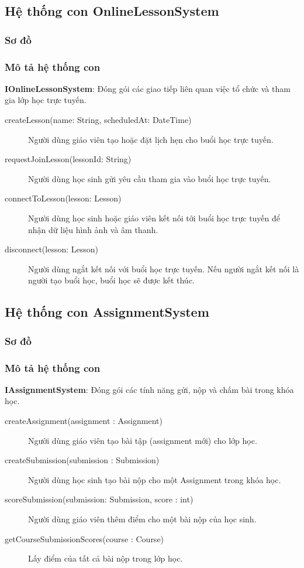 \documentclass[./../main_file.tex]{subfiles}
\begin{document}
	\subsection{Hệ thống con OnlineLessonSystem}
		\subsubsection{Sơ đồ}
		\begin{figure}[H]
		\end{figure}
		\subsubsection{Mô tả hệ thống con}
		\textbf{IOnlineLessonSystem}: Đóng gói các giao tiếp liên quan việc tổ chức và tham gia lớp học trực tuyến.
		\begin{description}
			\item[createLesson(name: String, scheduledAt: DateTime)] Người dùng giáo viên tạo hoặc đặt lịch hẹn cho buổi học trực tuyến.
			\item[requestJoinLesson(lessonId: String)] Người dùng học sinh gửi yêu cầu tham gia vào buổi học trực tuyến.
			\item[connectToLesson(lesson: Lesson)] Người dùng học sinh hoặc giáo viên kết nối tới buổi học trực tuyến để nhận dữ liệu hình ảnh và âm thanh.
			\item[disconnect(lesson: Lesson)] Người dùng ngắt kết nối với buổi học trực tuyến. Nếu người ngắt kết nối là người tạo buổi học, buổi học sẽ được kết thúc.
		\end{description}
		
	\subsection{Hệ thống con AssignmentSystem}
		\subsubsection{Sơ đồ}
		\subsubsection{Mô tả hệ thống con}
		\textbf{IAssignmentSystem}: Đóng gói các tính năng gửi, nộp và chấm bài trong khóa học.
		\begin{description}
			\item[createAssignment(assignment : Assignment)] Người dùng giáo viên tạo bài tập (assignment mới) cho lớp học.
			\item[createSubmission(submission : Submission)] Người dùng học sinh tạo bài nộp cho một Assignment trong khóa học.
			\item[scoreSubmission(submission: Submission, score : int)] Người dùng giáo viên thêm điểm cho một bài nộp của học sinh.
			\item[getCourseSubmissionScores(course : Course)] Lấy điểm của tất cả bài nộp trong lớp học.
		\end{description}
		
\end{document}
